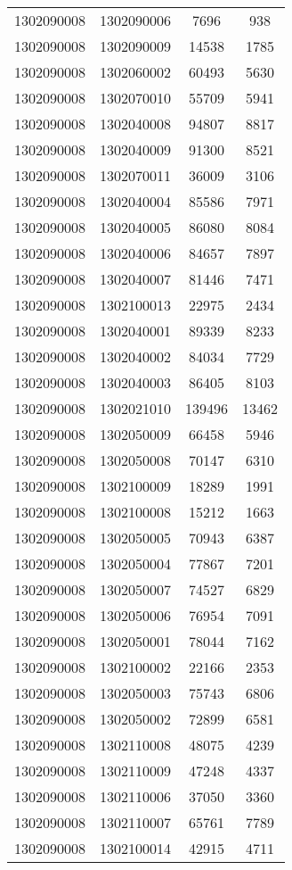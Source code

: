 \begin{longtable}{llcc}
1302090008 & 1302090006 & 7696 & 938\\
1302090008 & 1302090009 & 14538 & 1785\\
1302090008 & 1302060002 & 60493 & 5630\\
1302090008 & 1302070010 & 55709 & 5941\\
1302090008 & 1302040008 & 94807 & 8817\\
1302090008 & 1302040009 & 91300 & 8521\\
1302090008 & 1302070011 & 36009 & 3106\\
1302090008 & 1302040004 & 85586 & 7971\\
1302090008 & 1302040005 & 86080 & 8084\\
1302090008 & 1302040006 & 84657 & 7897\\
1302090008 & 1302040007 & 81446 & 7471\\
1302090008 & 1302100013 & 22975 & 2434\\
1302090008 & 1302040001 & 89339 & 8233\\
1302090008 & 1302040002 & 84034 & 7729\\
1302090008 & 1302040003 & 86405 & 8103\\
1302090008 & 1302021010 & 139496 & 13462\\
1302090008 & 1302050009 & 66458 & 5946\\
1302090008 & 1302050008 & 70147 & 6310\\
1302090008 & 1302100009 & 18289 & 1991\\
1302090008 & 1302100008 & 15212 & 1663\\
1302090008 & 1302050005 & 70943 & 6387\\
1302090008 & 1302050004 & 77867 & 7201\\
1302090008 & 1302050007 & 74527 & 6829\\
1302090008 & 1302050006 & 76954 & 7091\\
1302090008 & 1302050001 & 78044 & 7162\\
1302090008 & 1302100002 & 22166 & 2353\\
1302090008 & 1302050003 & 75743 & 6806\\
1302090008 & 1302050002 & 72899 & 6581\\
1302090008 & 1302110008 & 48075 & 4239\\
1302090008 & 1302110009 & 47248 & 4337\\
1302090008 & 1302110006 & 37050 & 3360\\
1302090008 & 1302110007 & 65761 & 7789\\
1302090008 & 1302100014 & 42915 & 4711\\

\end{longtable}
